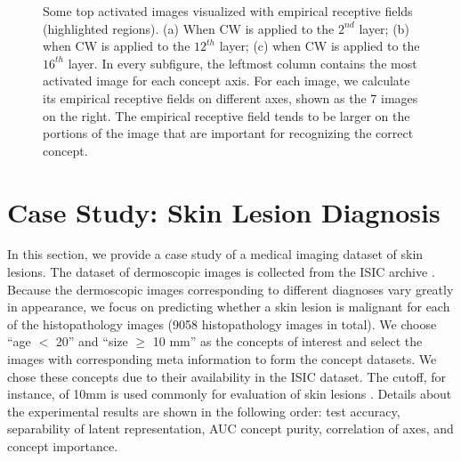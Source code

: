 \documentclass{article}
\begin{document}
\begin{figure}[htbp]

\caption{Some top activated images visualized with empirical receptive fields (highlighted regions). (a) When CW is applied to the $2^{nd}$ layer; (b) when CW is applied to  the $12^{th}$ layer; (c) when CW is applied to  the $16^{th}$ layer. In every subfigure, the leftmost column contains the most activated image for each concept axis. For each image, we calculate its empirical receptive fields on different axes, shown as the 7 images on the right. The empirical receptive field tends to be larger on the portions of the image that are important for recognizing the correct concept.}

\label{fig:empirical_RF}

\end{figure}

\section{Case Study: Skin Lesion Diagnosis}
\label{sec:isic_app}
In this section, we provide a case study of a medical imaging dataset of skin lesions. The dataset of dermoscopic images is collected from the ISIC archive \cite{isic2020}. Because the dermoscopic images corresponding to different diagnoses vary greatly in appearance, we focus on predicting whether a skin lesion is malignant for each of the histopathology images (9058 histopathology images in total). We choose ``age $<$ 20'' and ``size $\geq$ 10 mm'' as the concepts of interest and select the images with corresponding meta information to form the concept datasets. We chose these concepts due to their availability in the ISIC dataset. The cutoff, for instance, of 10mm is used commonly for evaluation of skin lesions \citep{lewis1998}. Details about the experimental results are shown in the following order: test accuracy, separability of latent representation, AUC concept purity, correlation of axes, and concept importance.
\end{document}
